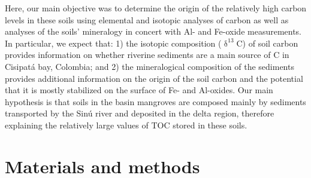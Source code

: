 \DIFaddbegin {}

\DIFaddend Here, our main objective was to determine the origin of the relatively high carbon levels in these soils using elemental and isotopic analyses of carbon as well as analyses of the soils' mineralogy in concert with Al- and Fe-oxide measurements. \DIFdelbegin {}\DIFdelend In particular, we expect that: 1) the isotopic composition ($\updelta ^{13}$C) of soil carbon provides information on whether riverine sediments are a main source of C in Cisipat\'a bay, Colombia; and  2) the mineralogical composition of the sediments provides additional information on the origin of the soil carbon and the potential that it is mostly stabilized on the surface of Fe- and Al-oxides. Our main hypothesis is that soils in the basin mangroves are composed mainly by sediments transported by the Sin\'u river and deposited in the delta region, therefore explaining the relatively large values of TOC stored in these soils. 



\section{Materials and methods} \label{sec:1}
